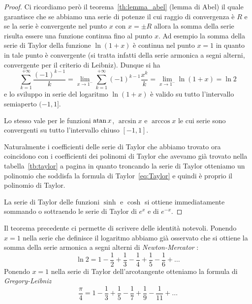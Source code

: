\begin{proof}
  Ci ricordiamo però il teorema~\ref{th:lemma_abel} (lemma di Abel) il quale 
  garantisce che se abbiamo una serie di potenze il cui raggio di convergenza 
  è $R$ e se la serie è convergente nel punto $x$ con $x=\pm R$ allora 
  la somma della serie risulta essere una funzione continua fino al punto $x$.
  Ad esempio la somma della serie di Taylor della funzione $\ln(1+x)$
  è continua nel punto $x=1$ in quanto in tale punto è convergente 
  (si tratta infatti della serie armonica a segni alterni, 
  convergente per il criterio di Leibniz). 
  Dunque si ha 
  \begin{equation}\label{eq:somma_serie_leibniz}
    \sum_{k=1}^{+\infty} \frac{(-1)^{k-1}} k 
    = \lim_{x\to 1^-} \sum_{k=1}^{+\infty} (-1)^{k-1} \frac{x^k}{k}
    = \lim_{x\to 1^-} \ln (1+x) = \ln 2 
  \end{equation}
  e lo sviluppo in serie del logaritmo $\ln(1+x)$ è valido su 
  tutto l'intervallo semiaperto $(-1,1]$. 

  Lo stesso vale per le funzioni $\operatorname{atan} x$, $\arcsin x$ e $\arccos x$ le cui serie 
  sono convergenti su tutto l'intervallo chiuso $[-1,1]$.

  Naturalmente i coefficienti delle serie di Taylor che abbiamo trovato ora
  coincidono con i coefficienti 
  dei polinomi di Taylor che avevamo già trovato nella tabella~\ref{tb:taylor}
  a pagina \pageref{tb:taylor} in quanto troncando la serie di Taylor otteniamo 
  un polinomio che soddisfa la formula di Taylor~\eqref{eq:Taylor} 
  e quindi è proprio il polinomio di Taylor.

  La serie di Taylor delle funzioni $\sinh$ e $\cosh$ si ottiene immediatamente 
  sommando o sottraendo le serie di Taylor di $e^x$ e di $e^{-x}$.
\end{proof}

Il teorema precedente ci permette di scrivere delle identità notevoli. 
Ponendo $x=1$ nella serie che definisce il logaritmo abbiamo già osservato 
che si ottiene la somma della serie armonica a segni alterni di \emph{Newton-Mercator}%
%
:
%
%
%
%
\begin{equation}\label{eq:serie_ln2}
  \ln 2 = 1 - \frac 1 2 + \frac 1 3 - \frac 1 4 + \frac 1 5 - \frac 1 6 + \dots
\end{equation}
Ponendo $x=1$ nella serie di Taylor dell'arcotangente otteniamo 
la formula di \emph{Gregory-Leibniz}%
%
%
%
%
%
\[
  \frac \pi 4 =
   1 - \frac 1 3 + \frac 1 5 - \frac 1 7 + \frac 1 9 - \frac 1 {11} + \dots
\]

